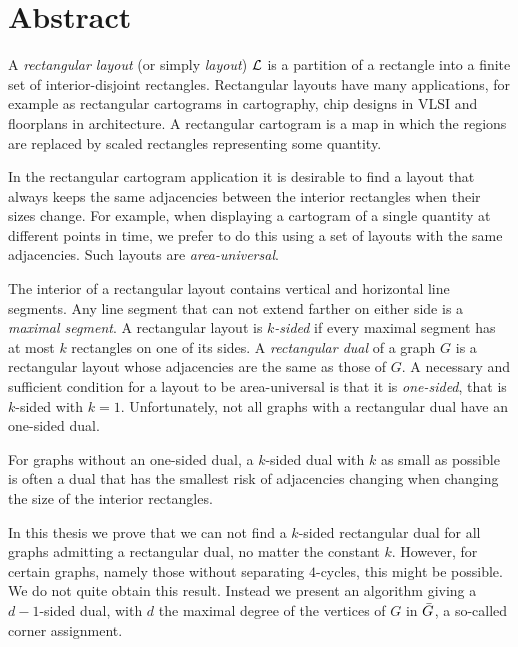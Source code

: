 
\section*{Abstract}
\thispagestyle{plain}

  A  \emph{rectangular layout} (or simply \emph{layout}) $\mathcal{L}$ is a partition of a rectangle into a finite set of interior-disjoint rectangles. Rectangular layouts have many applications, for example as rectangular cartograms in cartography, chip designs in VLSI and floorplans in architecture. A rectangular cartogram is a map in which the regions are replaced by scaled rectangles representing some quantity.

  In the rectangular cartogram application it is desirable to find a layout that always keeps the same adjacencies between the interior rectangles when their sizes change. For example, when displaying a cartogram of a single quantity at different points in time, we prefer to do this using a set of layouts with the same adjacencies. Such layouts are \emph{area-universal}.

  The interior of a rectangular layout contains vertical and horizontal line segments.
  Any line segment that can not extend farther on either side is a \emph{maximal segment}.
  A rectangular layout is \emph{$k$-sided} if every maximal segment has at most $k$ rectangles on one of its sides.
  A \emph{rectangular dual} of a graph $G$ is a rectangular layout whose adjacencies are the same as those of $G$.
  A necessary and sufficient condition for a layout to be area-universal is that it is \emph{one-sided}, that is $k$-sided with $k=1$.
  Unfortunately, not all graphs with a rectangular dual have an one-sided dual.

  For graphs without an one-sided dual, a $k$-sided dual with $k$ as small as possible is often a dual that has the smallest risk of adjacencies changing when changing the size of the interior rectangles.

  In this thesis we prove that we can not find a $k$-sided rectangular dual for all graphs admitting a rectangular dual, no matter the constant $k$.
  However, for certain graphs, namely those without separating $4$-cycles, this might be possible.
  We do not quite obtain this result. Instead we present an algorithm giving a $d-1$-sided dual, with $d$ the maximal degree of the vertices of $G$ in $\bar{G}$, a so-called corner assignment.
